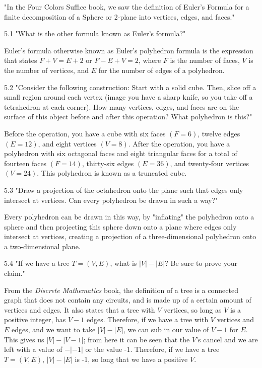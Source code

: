 \documentclass{article}
\begin{document}
\clearpage
\header

\item "In the Four Colors Suffice book, we saw the definition of Euler's Formula for a finite decomposition of a Sphere or 2-plane into vertices, edges, and faces."

5.1 "What is the other formula known as Euler's formula?"

Euler's formula otherwise known as Euler's polyhedron formula is the expression that states $F + V = E + 2$ or $F - E + V = 2$, where $F$ is the number of faces, $V$ is the number of vertices, and $E$ for the number of edges of a polyhedron.


5.2 "Consider the following construction: Start with a solid cube. Then, slice off a small region around each vertex (image you have a sharp knife, so you take off a tetrahedron at each corner). How many vertices, edges, and faces are on the surface of this object before and after this operation? What polyhedron is this?"

Before the operation, you have a cube with six faces $(F = 6)$, twelve edges $(E = 12)$, and eight vertices $(V = 8)$. After the operation, you have a polyhedron with six octagonal faces and eight triangular faces for a total of fourteen faces $(F = 14)$, thirty-six edges $(E = 36)$, and twenty-four vertices $(V = 24)$. This polyhedron is known as a truncated cube. 

5.3 "Draw a projection of the octahedron onto the plane such that edges only intersect at vertices. Can every polyhedron be drawn in such a way?"

Every polyhedron can be drawn in this way, by "inflating" the polyhedron onto a sphere and then projecting this sphere down onto a plane where edges only intersect at vertices, creating a projection of a three-dimensional polyhedron onto a two-dimensional plane.

5.4 "If we have a tree $T=(V,E)$, what is $|V|-|E|$? Be sure to prove your claim."

From the \textit{Discrete Mathematics} book, the definition of a tree is a connected graph that does not contain any circuits, and is made up of a certain amount of vertices and edges. It also states that a tree with $V$ vertices, so long as $V$ is a positive integer, has $V - 1$ edges. Therefore, if we have a tree with $V$ vertices and $E$ edges, and we want to take $|V|-|E|$, we can sub in our value of $V - 1$ for $E$. This gives us $|V|-|V - 1|$; from here it can be seen that the $V$'s cancel and we are left with a value of $-|-1|$ or the value -1. Therefore, if we have a tree $T=(V,E)$, $|V|-|E|$ is -1, so long that we have a positive $V$.
\end{document}
